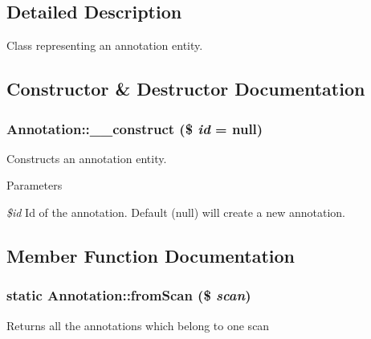 \subsection{Detailed Description}
Class representing an annotation entity. 

\subsection{Constructor \& Destructor Documentation}
\hypertarget{classAnnotation_af57b6e7052a1fecfeb356cdff41c496d}{
\subsubsection[{\_\-\_\-construct}]{\setlength{\rightskip}{0pt plus 5cm}Annotation::\_\-\_\-construct (\$ {\em id} = {\ttfamily null})}}
\label{classAnnotation_af57b6e7052a1fecfeb356cdff41c496d}
Constructs an annotation entity.


\begin{DoxyParams}{Parameters}
\item[{\em \$id}]Id of the annotation. Default (null) will create a new annotation. \end{DoxyParams}


\subsection{Member Function Documentation}
\hypertarget{classAnnotation_a7c5fdcc3bcb0502df6512a6613507458}{
\subsubsection[{fromScan}]{\setlength{\rightskip}{0pt plus 5cm}static Annotation::fromScan (\$ {\em scan})}}
\label{classAnnotation_a7c5fdcc3bcb0502df6512a6613507458}
Returns all the annotations which belong to one scan


